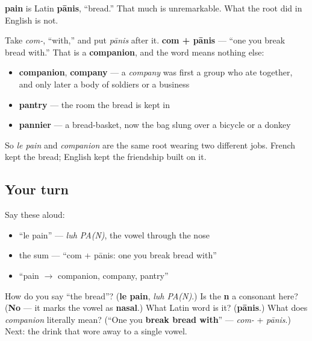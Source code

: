 \begin{cousinweb}
\textbf{pain} is Latin \textbf{pānis}, \textquotedblleft{}bread.\textquotedblright{} That much is unremarkable. What the root did in English is not.

Take \emph{com-}, \textquotedblleft{}with,\textquotedblright{} and put \emph{pānis} after it. \textbf{com + pānis} — \textquotedblleft{}one you break bread with.\textquotedblright{} That is a \textbf{companion}, and the word means nothing else:

\begin{itemize}
\raggedright
  \item \textbf{companion}, \textbf{company} — a \emph{company} was first a group who ate together, and only later a body of soldiers or a business
  \item \textbf{pantry} — the room the bread is kept in
  \item \textbf{pannier} — a bread-basket, now the bag slung over a bicycle or a donkey
\end{itemize}

So \emph{le pain} and \emph{companion} are the same root wearing two different jobs. French kept the bread; English kept the friendship built on it.
\end{cousinweb}

\subsection*{Your turn}
Say these aloud:

\begin{itemize}
\raggedright
  \item \textquotedblleft{}le pain\textquotedblright{} — \emph{luh PA(N)}, the vowel through the nose
  \item the sum — \textquotedblleft{}com + pānis: one you break bread with\textquotedblright{}
  \item \textquotedblleft{}pain $\to$ companion, company, pantry\textquotedblright{}
\end{itemize}

\begin{tcolorbox}[breakable,colback=teal!4,colframe=teal!35!black,title={Before you move on}]
How do you say \textquotedblleft{}the bread\textquotedblright{}? (\textbf{le pain}, \emph{luh PA(N)}.) Is the \textbf{n} a consonant here? (\textbf{No} — it marks the vowel as \textbf{nasal}.) What Latin word is it? (\textbf{pānis}.) What does \emph{companion} literally mean? (\textquotedblleft{}One you \textbf{break bread with}\textquotedblright{} — \emph{com-} + \emph{pānis}.) Next: the drink that wore away to a single vowel.
\end{tcolorbox}
